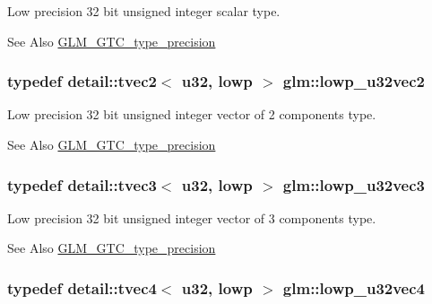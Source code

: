 Low precision 32 bit unsigned integer scalar type. \begin{DoxySeeAlso}{See Also}
\hyperlink{group__gtc__type__precision}{G\-L\-M\-\_\-\-G\-T\-C\-\_\-type\-\_\-precision} 
\end{DoxySeeAlso}
\hypertarget{group__gtc__type__precision_ga2f588e15c609987b89bd03f50b2a492d}{
\subsubsection[{lowp\-\_\-u32vec2}]{\setlength{\rightskip}{0pt plus 5cm}typedef detail\-::tvec2$<$ u32, lowp $>$ {\bf glm\-::lowp\-\_\-u32vec2}}}\label{group__gtc__type__precision_ga2f588e15c609987b89bd03f50b2a492d}
Low precision 32 bit unsigned integer vector of 2 components type. \begin{DoxySeeAlso}{See Also}
\hyperlink{group__gtc__type__precision}{G\-L\-M\-\_\-\-G\-T\-C\-\_\-type\-\_\-precision} 
\end{DoxySeeAlso}
\hypertarget{group__gtc__type__precision_ga53b6133cd2491fce1445c1744556b1bb}{
\subsubsection[{lowp\-\_\-u32vec3}]{\setlength{\rightskip}{0pt plus 5cm}typedef detail\-::tvec3$<$ u32, lowp $>$ {\bf glm\-::lowp\-\_\-u32vec3}}}\label{group__gtc__type__precision_ga53b6133cd2491fce1445c1744556b1bb}
Low precision 32 bit unsigned integer vector of 3 components type. \begin{DoxySeeAlso}{See Also}
\hyperlink{group__gtc__type__precision}{G\-L\-M\-\_\-\-G\-T\-C\-\_\-type\-\_\-precision} 
\end{DoxySeeAlso}
\hypertarget{group__gtc__type__precision_gaad6408408c9c5321cb6ee54f201de578}{
\subsubsection[{lowp\-\_\-u32vec4}]{\setlength{\rightskip}{0pt plus 5cm}typedef detail\-::tvec4$<$ u32, lowp $>$ {\bf glm\-::lowp\-\_\-u32vec4}}}\label{group__gtc__type__precision_gaad6408408c9c5321cb6ee54f201de578}
